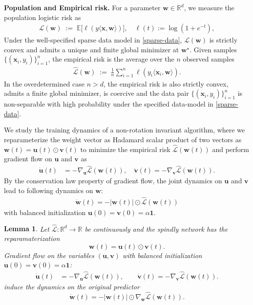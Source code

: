 \documentclass{article}
\theoremstyle{plain}
\newtheorem{lemma}[theorem]{Lemma}
\theoremstyle{definition}
\theoremstyle{remark}
\begin{document}
{\textbf{Population and Empirical risk.}
For a parameter $\mathbf{w} \in \mathbb{R}^d$, we measure the population logistic risk as 
\begin{align}
\label{pop-risk}
\mathcal{L}(\mathbf{w})
\;:=\;
\mathbb{E}
\big[\ell(y\langle \mathbf{x},\mathbf{w}\rangle)\big],
\quad 
\ell(t):=\log(1+e^{-t}),
\end{align}
Under the well-specified sparse data model in \eqref{sparse-data}, $\mathcal{L}(\mathbf{w})$ is strictly convex and admits a unique and finite global minimizer at $\mathbf{w}^\star$. 
Given samples $\{(\mathbf{x}_i,y_i)\}_{i=1}^n$, the empirical risk is the average over the $n$ observed samples
\begin{align}
\label{emp-risk}
\widehat{\mathcal{L}}(\mathbf{w})
\;:=\;
\frac{1}{n}\sum_{i=1}^n
\ell\!\left(y_i\langle \mathbf{x}_i,\mathbf{w}\rangle\right).
\end{align}
In the overdetermined case $n>d$, the empirical risk is also strictly convex, admits a finite global minimizer, is coercive and the data pair $\{(\mathbf{x}_i,y_i)\}_{i=1}^n$ is non-separable with high probability under the specified data-model in \eqref{sparse-data}. 

We study the training dynamics of a non-rotation invariant algorithm, where we reparameterize the weight vector as Hadamard scalar product of two vectors as $\mathbf{w}(t)=\mathbf{u}(t)\odot\mathbf{v}(t)$ to minimize the empirical risk $\widehat{\mathcal{L}}(\mathbf{w}(t))$ and perform gradient flow on $\mathbf{u}$ and $\mathbf{v}$ as 
\begin{align}
\dot{\mathbf{u}}(t)
&=
- \nabla_{\mathbf{u}}
\widehat{\mathcal{L}}(\mathbf{w}(t)),
\quad
\dot{\mathbf{v}}(t)
=
- \nabla_{\mathbf{v}}
\widehat{\mathcal{L}}(\mathbf{w}(t)).
\end{align}
By the conservation law property of gradient flow, the joint dynamics on $\mathbf{u}$ and $\mathbf{v}$ lead to following dynamics on $\mathbf{w}$:
\begin{align}
\label{spindly-ode}
    \dot{\mathbf{w}}(t) = -|\mathbf{w}(t)| \odot \widehat{\mathcal{L}}(\mathbf{w}(t))
\end{align}
with balanced initialization $\mathbf{u}(0)=\mathbf{v}(0)=\alpha \mathbf{1}$.


\begin{lemma}
\label{lem:spindly_dynamics}
Let $\widehat{\mathcal L}:\mathbb R^{d}\to\mathbb R$ be continuously and the spindly network has the reparamaterization
\[
\boldsymbol w(t)=\boldsymbol u(t)\odot \boldsymbol v(t).
\]
 Gradient flow on the variables $(\boldsymbol u,\boldsymbol v)$ with balanced initialization $\mathbf{u}(0)=\mathbf{v}(0)=\alpha \mathbf{1}$:
\begin{align}
\dot{\boldsymbol u}(t)
&=
-\nabla_{\boldsymbol u}\widehat{\mathcal L}(\boldsymbol w(t)),
\qquad
\dot{\boldsymbol v}(t)
=
-\nabla_{\boldsymbol v}\widehat{\mathcal L}(\boldsymbol w(t)).
\end{align}
induce the dynamics on the original predictor
\[
\dot{\boldsymbol w}(t)
=
-|\boldsymbol w(t)|\odot
\nabla_{\boldsymbol w}\widehat{\mathcal L}(\boldsymbol w(t)).
\]
\end{lemma}

}
\end{document}
